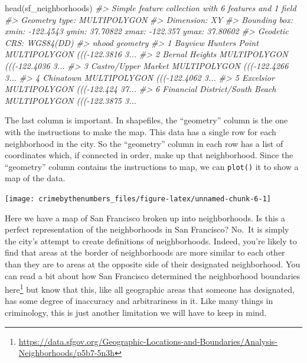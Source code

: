 \documentclass[
]{krantz}
\makeatletter
\newenvironment{Shaded}{\begin{snugshade}}{\end{snugshade}}
\newcommand{\CommentTok}[1]{\textcolor[rgb]{0.37,0.37,0.37}{\textit{#1}}}
\newcommand{\FunctionTok}[1]{\textcolor[rgb]{0,0,0}{#1}}
\newcommand{\NormalTok}[1]{#1}
\newcommand{\SpecialCharTok}[1]{\textcolor[rgb]{0,0,0}{#1}}
\renewcommand{\href}[2]{#2\footnote{\url{#1}}}
\newenvironment{kframe}{%
\medskip{}
\setlength{\fboxsep}{.8em}
 \def\at@end@of@kframe{}%
 \ifinner\ifhmode%
  \def\at@end@of@kframe{\end{minipage}}%
  \begin{minipage}{\columnwidth}%
 \fi\fi%
 \def\FrameCommand##1{\hskip\@totalleftmargin \hskip-\fboxsep
 \colorbox{shadecolor}{##1}\hskip-\fboxsep
     \hskip-\linewidth \hskip-\@totalleftmargin \hskip\columnwidth}%
 \MakeFramed {\advance\hsize-\width
   \@totalleftmargin\z@ \linewidth\hsize
   \@setminipage}}%
 {\par\unskip\endMakeFramed%
 \at@end@of@kframe}
\renewenvironment{Shaded}{\begin{kframe}}{\end{kframe}}
\makeatother
\begin{document}
\begin{Shaded}
\begin{Highlighting}[]
\FunctionTok{head}\NormalTok{(sf\_neighborhoods)}
\CommentTok{\#\textgreater{} Simple feature collection with 6 features and 1 field}
\CommentTok{\#\textgreater{} Geometry type: MULTIPOLYGON}
\CommentTok{\#\textgreater{} Dimension:     XY}
\CommentTok{\#\textgreater{} Bounding box:  xmin: {-}122.4543 ymin: 37.70822 xmax: {-}122.357 ymax: 37.80602}
\CommentTok{\#\textgreater{} Geodetic CRS:  WGS84(DD)}
\CommentTok{\#\textgreater{}                            nhood                       geometry}
\CommentTok{\#\textgreater{} 1          Bayview Hunters Point MULTIPOLYGON ((({-}122.3816 3...}
\CommentTok{\#\textgreater{} 2                 Bernal Heights MULTIPOLYGON ((({-}122.4036 3...}
\CommentTok{\#\textgreater{} 3            Castro/Upper Market MULTIPOLYGON ((({-}122.4266 3...}
\CommentTok{\#\textgreater{} 4                      Chinatown MULTIPOLYGON ((({-}122.4062 3...}
\CommentTok{\#\textgreater{} 5                      Excelsior MULTIPOLYGON ((({-}122.424 37...}
\CommentTok{\#\textgreater{} 6 Financial District/South Beach MULTIPOLYGON ((({-}122.3875 3...}
\end{Highlighting}
\end{Shaded}

The last column is important. In shapefiles, the ``geometry'' column is the one with the instructions to make the map. This data has a single row for each neighborhood in the city. So the ``geometry'' column in each row has a list of coordinates which, if connected in order, make up that neighborhood. Since the ``geometry'' column contains the instructions to map, we can \texttt{plot()} it to show a map of the data.

\begin{Shaded}
\end{Shaded}

\begin{center}\texttt{[image: crimebythenumbers\_files/figure-latex/unnamed-chunk-6-1]} \end{center}

Here we have a map of San Francisco broken up into neighborhoods. Is this a perfect representation of the neighborhoods in San Francisco? No.~It is simply the city's attempt to create definitions of neighborhoods. Indeed, you're likely to find that areas at the border of neighborhoods are more similar to each other than they are to areas at the opposite side of their designated neighborhood. You can read a bit about how San Francisco determined the neighborhood boundaries \href{https://data.sfgov.org/Geographic-Locations-and-Boundaries/Analysis-Neighborhoods/p5b7-5n3h}{here} but know that this, like all geographic areas that someone has designated, has some degree of inaccuracy and arbitrariness in it. Like many things in criminology, this is just another limitation we will have to keep in mind.
\end{document}

